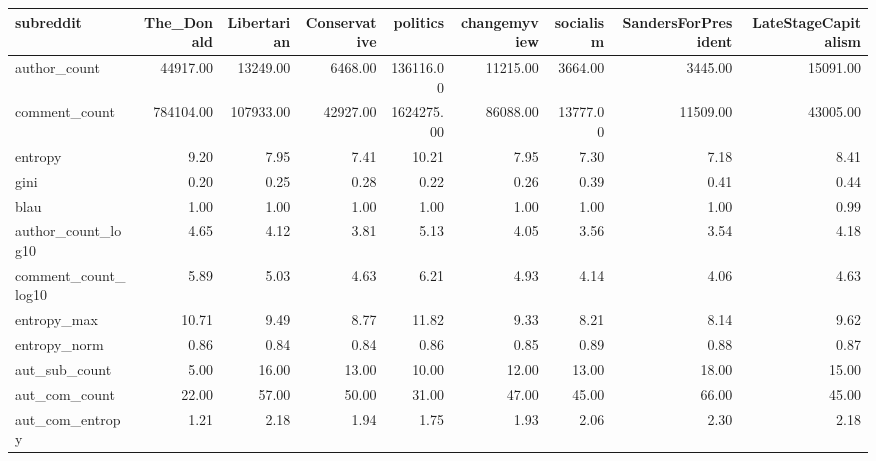 \begin{table}
\centering
\begin{tabular}{lrrrrrrrr}
\toprule
subreddit &  The\_Donald &  Libertarian &  Conservative &   politics &  changemyview &  socialism &  SandersForPresident &  LateStageCapitalism \\
\midrule
author\_count        &    44917.00 &     13249.00 &       6468.00 &  136116.00 &      11215.00 &    3664.00 &              3445.00 &             15091.00 \\
comment\_count       &   784104.00 &    107933.00 &      42927.00 & 1624275.00 &      86088.00 &   13777.00 &             11509.00 &             43005.00 \\
entropy             &        9.20 &         7.95 &          7.41 &      10.21 &          7.95 &       7.30 &                 7.18 &                 8.41 \\
gini                &        0.20 &         0.25 &          0.28 &       0.22 &          0.26 &       0.39 &                 0.41 &                 0.44 \\
blau                &        1.00 &         1.00 &          1.00 &       1.00 &          1.00 &       1.00 &                 1.00 &                 0.99 \\
author\_count\_log10  &        4.65 &         4.12 &          3.81 &       5.13 &          4.05 &       3.56 &                 3.54 &                 4.18 \\
comment\_count\_log10 &        5.89 &         5.03 &          4.63 &       6.21 &          4.93 &       4.14 &                 4.06 &                 4.63 \\
entropy\_max         &       10.71 &         9.49 &          8.77 &      11.82 &          9.33 &       8.21 &                 8.14 &                 9.62 \\
entropy\_norm        &        0.86 &         0.84 &          0.84 &       0.86 &          0.85 &       0.89 &                 0.88 &                 0.87 \\
aut\_sub\_count       &        5.00 &        16.00 &         13.00 &      10.00 &         12.00 &      13.00 &                18.00 &                15.00 \\
aut\_com\_count       &       22.00 &        57.00 &         50.00 &      31.00 &         47.00 &      45.00 &                66.00 &                45.00 \\
aut\_com\_entropy     &        1.21 &         2.18 &          1.94 &       1.75 &          1.93 &       2.06 &                 2.30 &                 2.18 \\

\end{tabular}
\end{table}
